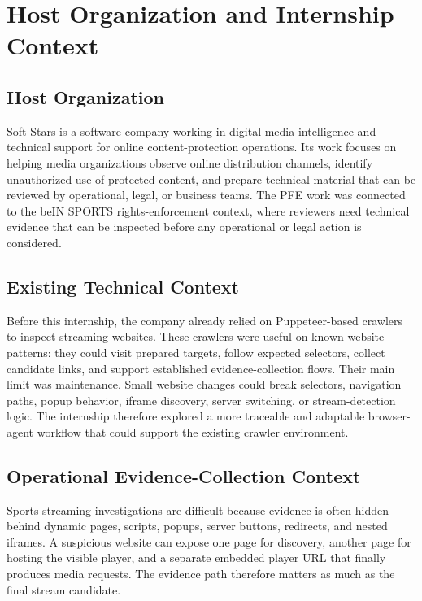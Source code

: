 \section{Host Organization and Internship Context}

\subsection{Host Organization}

Soft Stars is a software company working in digital media intelligence and
technical support for online content-protection operations. Its work focuses
on helping media organizations observe online distribution channels, identify
unauthorized use of protected content, and prepare technical material that can
be reviewed by operational, legal, or business teams. The PFE work was
connected to the beIN SPORTS rights-enforcement context, where reviewers need
technical evidence that can be inspected before any operational or legal action
is considered.

\subsection{Existing Technical Context}

Before this internship, the company already relied on Puppeteer-based crawlers
to inspect streaming websites. These crawlers were useful on known website
patterns: they could visit prepared targets, follow expected selectors, collect
candidate links, and support established evidence-collection flows. Their main
limit was maintenance. Small website changes could break selectors, navigation
paths, popup behavior, iframe discovery, server switching, or stream-detection
logic. The internship therefore explored a more traceable and adaptable
browser-agent workflow that could support the existing crawler environment.

\subsection{Operational Evidence-Collection Context}

Sports-streaming investigations are difficult because evidence is often hidden
behind dynamic pages, scripts, popups, server buttons, redirects, and nested
iframes. A suspicious website can expose one page for discovery, another page
for hosting the visible player, and a separate embedded player URL that finally
produces media requests. The evidence path therefore matters as much as the
final stream candidate.

